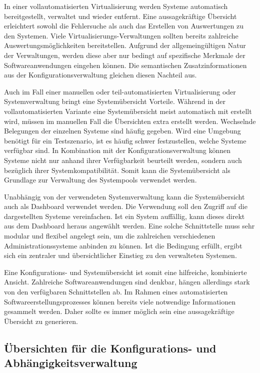 In einer vollautomatisierten Virtualisierung werden Systeme automatisch bereitgestellt, verwaltet und wieder entfernt. Eine aussagekräftige Übersicht erleichtert sowohl die Fehlersuche als auch das Erstellen von Auswertungen zu den Systemen. Viele Virtualisierungs\hyp{}Verwaltungen sollten bereits zahlreiche Auswertungsmöglichkeiten bereitstellen. Aufgrund der allgemeingültigen Natur der Verwaltungen, werden diese aber nur bedingt auf spezifische Merkmale der Softwareanwendungen eingehen können. Die semantischen Zusatzinformationen aus der Konfigurationsverwaltung gleichen diesen Nachteil aus.

Auch im Fall einer manuellen oder teil-automatisierten Virtualisierung oder Systemverwaltung bringt eine Systemübersicht Vorteile. Während in der vollautomatisierten Variante eine Systemübersicht meist automatisch mit erstellt wird, müssen im manuellen Fall die Übersichten extra erstellt werden. Wechselnde Belegungen der einzelnen Systeme sind häufig gegeben. Wird eine Umgebung benötigt für ein Testszenario, ist es häufig schwer festzustellen, welche Systeme verfügbar sind. In Kombination mit der Konfigurationsverwaltung können Systeme nicht nur anhand ihrer Verfügbarkeit beurteilt werden, sondern auch bezüglich ihrer Systemkompatibilität. Somit kann die Systemübersicht als Grundlage zur Verwaltung des Systempools verwendet werden.

Unabhängig von der verwendeten Systemverwaltung kann die Systemübersicht auch als Dashboard verwendet werden. Die Verwendung soll den Zugriff auf die dargestellten Systeme vereinfachen. Ist ein System auffällig, kann dieses direkt aus dem Dashboard heraus angewählt werden. Eine solche Schnittstelle muss sehr modular und flexibel angelegt sein, um die zahlreichen verschiedenen Administrationssysteme anbinden zu können. Ist die Bedingung erfüllt, ergibt sich ein zentraler und übersichtlicher Einstieg zu den verwalteten Systemen.

Eine Konfigurations- und Systemübersicht ist somit eine hilfreiche, kombinierte Ansicht. Zahlreiche Softwareanwendungen sind denkbar, hängen allerdings stark von den verfügbaren Schnittstellen ab. Im Rahmen eines automatisierten Softwareerstellungsprozesses können bereits viele notwendige Informationen gesammelt werden. Daher sollte es immer möglich sein eine aussagekräftige Übersicht zu generieren.

\subsection{Übersichten für die Konfigurations- und Abhängigkeitsverwaltung}

